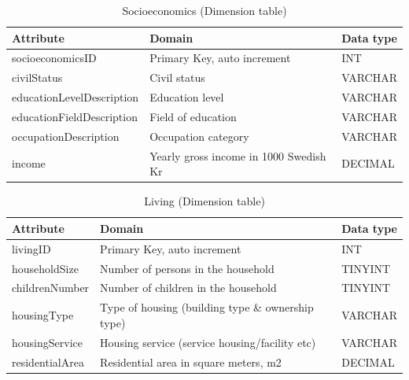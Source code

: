 \begin{table}[htbp]
  \centering
  \caption{Socioeconomics (Dimension table)}
  \begin{tabular}{|l|l|l|}
    \hline
    \textbf{Attribute} & \textbf{Domain} & \textbf{Data type} \\
    \hline
    socioeconomicsID & Primary Key, auto increment & INT \\
    \hline
    civilStatus & Civil status & VARCHAR \\
    \hline
    educationLevelDescription & Education level  & VARCHAR \\
    \hline
    educationFieldDescription & Field of education  & VARCHAR \\
    \hline
    occupationDescription & Occupation category & VARCHAR \\
    \hline
    income & Yearly gross income in 1000 Swedish Kr & DECIMAL \\
    \hline
  \end{tabular}
\end{table}

\begin{table}[htbp]
  \centering
  \caption{Living (Dimension table)}
  \begin{tabular}{|l|l|l|}
    \hline
    \textbf{Attribute} & \textbf{Domain} & \textbf{Data type} \\
    \hline
    livingID & Primary Key, auto increment & INT \\
    \hline
    householdSize & Number of persons in the household & TINYINT \\
    \hline
    childrenNumber & Number of children in the household & TINYINT \\
    \hline
    housingType & Type of housing (building type \& ownership type) & VARCHAR \\
    \hline
    housingService & Housing service (service housing/facility etc) & VARCHAR \\
    \hline
    residentialArea & Residential area in square meters, m2 & DECIMAL \\
    \hline
  \end{tabular}
\end{table}